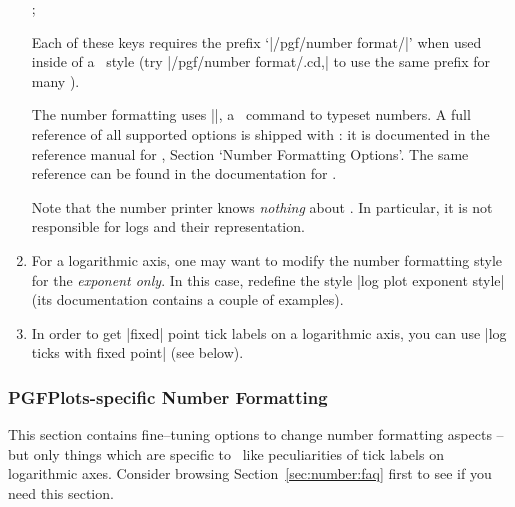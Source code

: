 \begin{enumerate}
\begin{codeexample}[]
; 
\end{codeexample}

\begin{codeexample}[]
\end{codeexample}

\begin{codeexample}[]
\end{codeexample}

\begin{codeexample}[]
\end{codeexample}

	\noindent Each of these keys requires the prefix `|/pgf/number format/|' when used inside of a \PGFPlots\ style (try |/pgf/number format/.cd,| to use the same prefix for many ).

	The number formatting uses |\pgfmathprintnumber|, a \pgfname\ command to typeset numbers. A full reference of all supported options is shipped with \PGFPlots: it is documented in the reference manual for \PGFPlotstable, Section `Number Formatting Options'. The same reference can be found in the documentation for \pgfname.

	Note that the number printer knows \emph{nothing} about \PGFPlots. In particular, it is not responsible for logs and their representation.

	\item For a logarithmic axis, one may want to modify the number formatting style for the \emph{exponent only}. In this case, redefine the style |log plot exponent style| (its documentation contains a couple of examples).

	\item In order to get |fixed| point tick labels on a logarithmic axis, you can use |log ticks with fixed point| (see below).
\end{enumerate}


\subsubsection{PGFPlots-specific Number Formatting}
This section contains fine--tuning options to change number formatting aspects -- but only things which are specific to \PGFPlots\ like peculiarities of tick labels on logarithmic axes. Consider browsing Section~\ref{sec:number:faq} first to see if you need this section. 

